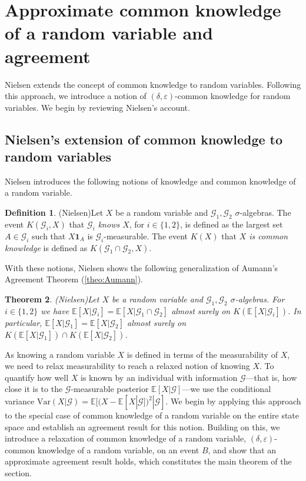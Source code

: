 \documentclass[a4paper, 10pt]{article}
\newtheorem{theorem}{Theorem}
\numberwithin{theorem}{section}
\theoremstyle{definition}
\newtheorem{definition}[theorem]{Definition}
\newcommand{\E}{\mathbb{E}}
\newcommand{\G}{\mathcal{G}}
\newcommand{\ind}[1]{\mathbf{1}_{#1}}
\newcommand{\Var}{\mathrm{Var}}
\renewcommand{\epsilon}{\varepsilon}
\begin{document}
\boldmath
\section{Approximate common knowledge of a random variable and agreement}
\unboldmath


Nielsen \cite{Ni84} extends the concept of common knowledge to random variables. Following this approach, we introduce a notion of $(\delta,\epsilon)$-common knowledge for random variables. We begin by reviewing Nielsen's account.

 \subsection{Nielsen's extension of common knowledge to random variables}

Nielsen introduces the following notions of knowledge and common knowledge of a random variable.

\begin{definition}{(Nielsen)}\label{def:understanding2}
	Let $X$ be a random variable and $\G_1, \G_2$ $\sigma$-algebras. The event  $K(\G_i,X)$ that \emph{$\G_i$ knows $X$}, for $i \in \{1,2\}$, is defined as the largest set $A \in \G_i$ such that $X\ind{A}$ is $\G_i$-measurable.
	The event $K(X)$ that \emph{$X$ is common knowledge} is defined as $K(\G_1 \cap \G_2,X)$.
\end{definition}


With these notions, Nielsen shows the following generalization of Aumann's Agreement Theorem (\ref{theo:Aumann}).




\begin{theorem}{(Nielsen)}\label{theo:aumann_nielsen}
	Let $X$ be a random variable and $\G_1,\G_2$ $\sigma$-algebras. For $i\in \{1,2\}$ we have $\E[X|\G_i]=\E[X| \G_1 \cap \G_2]$ 
	almost surely on $K(\E[X|\G_i])$. In particular, $\E[X|\G_1]=\E[X|\G_2]$ almost surely on $K(\E[X|\G_1]) \cap K(\E[X|\G_2])$.
\end{theorem}


As knowing a random variable $X$ is defined in terms of the measurability of $X$, we need to relax measurability to reach a relaxed notion of knowing $X$. To quantify how well $X$ is known by an individual with information $\G$---that is, how close it is to the $\G$-measurable posterior $\E[X|\G]$---we use the conditional variance $\Var(X|\G)= \E[(X-\E[X|\G])^2|\G]$. We begin by applying this approach to the special case of common knowledge of a random variable on the entire state space and establish an agreement result for this notion. Building on this, we introduce a relaxation of common knowledge of a random variable, $(\delta,\epsilon)$-common knowledge of a random variable, on an event $B$, and show that an approximate agreement result holds, which constitutes the main theorem of the section.
\end{document}
